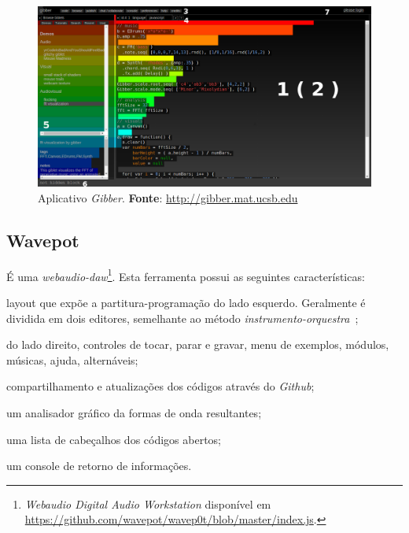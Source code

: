 \begin{figure}[h]
\centering
\includegraphics[scale=0.35]{gibber.png}
\caption{Aplicativo \emph{Gibber}. \textbf{Fonte}: \protect\url{http://gibber.mat.ucsb.edu}}
\label{fig:gibber}
\end{figure}


\subsection*{Wavepot}

É uma \emph{webaudio-daw}\footnote{\emph{Webaudio Digital Audio Workstation} disponível em \url{https://github.com/wavepot/wavep0t/blob/master/index.js}.}.
Esta ferramenta possui as seguintes características:\begin{inparaenum}
\item layout que expõe a partitura-programação \cite{fenerich_marulho_2014} do lado esquerdo. Geralmente é dividida em dois editores, semelhante ao método \emph{instrumento-orquestra}~\cite{mathews_digital_1963,di_nunzio_genesi_2010};
\item do lado direito, controles de tocar, parar e gravar, menu de exemplos, módulos, músicas, ajuda, alternáveis;
\item compartilhamento e atualizações dos códigos através do \emph{Github};
\item um analisador gráfico da formas de onda resultantes;
\item uma lista de cabeçalhos dos códigos abertos;
\item um console de retorno de informações.
\end{inparaenum}

